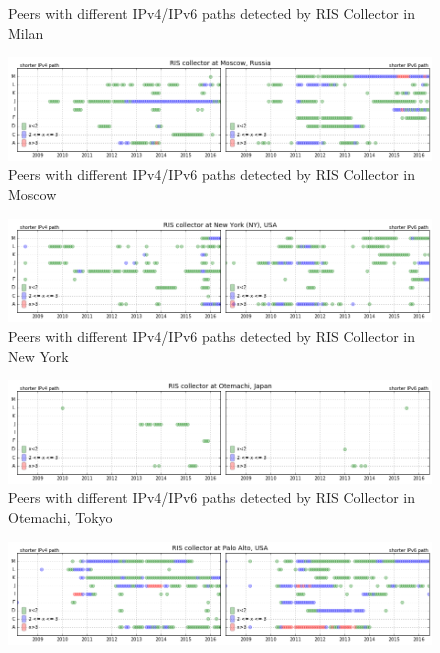 \begin{appendices}
\begin{figure}[!htb]
		\caption{Peers with different IPv4/IPv6 paths detected by RIS Collector in Milan}
		\label{fig:coll-milan}
	\end{figure}
	\begin{figure}[!htb]
		\centering
		\includegraphics[width=6.0in]{img/coll-moscow.png}
		\caption{Peers with different IPv4/IPv6 paths detected by RIS Collector in Moscow}
		\label{fig:coll-moscow}
	\end{figure}	
	\begin{figure}[!htb]
		\centering
		\includegraphics[width=6.0in]{img/coll-NY.png}
		\caption{Peers with different IPv4/IPv6 paths detected by RIS Collector in New York}
		\label{fig:coll-ny}
	\end{figure}	
	\begin{figure}[!htb]
		\centering
		\includegraphics[width=6.0in]{img/coll-otemachi.png}
		\caption{Peers with different IPv4/IPv6 paths detected by RIS Collector in Otemachi, Tokyo}
		\label{fig:coll-otemachi}
	\end{figure}	
	\begin{figure}[!htb]
		\centering
		\includegraphics[width=6.0in]{img/coll-palo-alto.png}

\end{figure}
\end{appendices}
